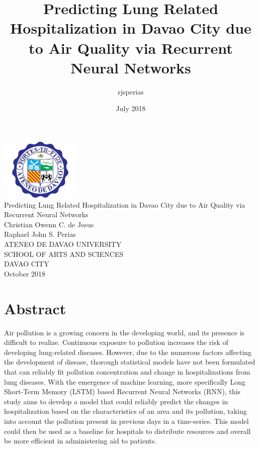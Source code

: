 ﻿\documentclass[10pt,11pt,12pt,oneside]{book}
\title{Predicting Lung Related Hospitalization in Davao City due to Air Quality via Recurrent Neural Networks}
\author{rjsperias}
\date{July 2018}
\begin{document}
\cleardoublepage
\begin{titlepage}
    \begin{center}
        \includegraphics[width=1.5in]{addu.pdf}\\
        \vspace{1cm}
        \huge{Predicting Lung Related Hospitalization  in Davao City due to Air Quality via Recurrent Neural Networks}\\
        \vspace{1.5in}
        \large{Christian Owenn C. de Jesus}\\
        \large{Raphael John S. Perias}\\
        \vspace{1.5in}
        \large{ATENEO DE DAVAO UNIVERSITY\\SCHOOL OF ARTS AND SCIENCES\\DAVAO CITY}\\
        \vspace{1in}
        October 2018
    \end{center}
\end{titlepage}
\frontmatter
\chapter*{Abstract}
Air pollution is a growing concern in the developing world, and its presence is difficult to realize. Continuous exposure to pollution increases the risk of developing lung-related diseases.
However, due to the numerous factors affecting the development of disease, thorough statistical models have not been formulated that can reliably fit pollution concentration and change in hospitalizations from lung diseases. With the emergence of machine learning, more specifically Long Short-Term Memory (LSTM) based Recurrent Neural Networks (RNN), this study aims to develop a model that could reliably predict the changes in hospitalization based on the characteristics of an area and its pollution, taking into account the pollution present in previous days in a time-series. This model could then be used as a baseline for hospitals to distribute resources and overall be more efficient in administering aid to patients.
\mainmatter
\end{document}
